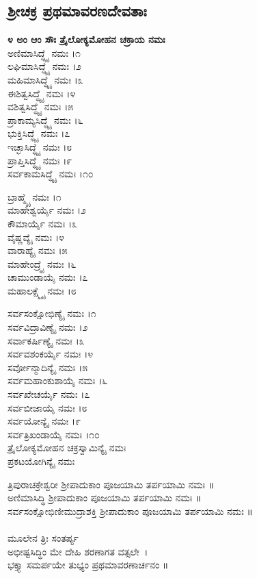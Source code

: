 \subsection{ಶ್ರೀಚಕ್ರ ಪ್ರಥಮಾವರಣದೇವತಾಃ}
{\bfseries ೪ ಅಂ ಆಂ ಸೌಃ ತ್ರೈಲೋಕ್ಯಮೋಹನ ಚಕ್ರಾಯ ನಮಃ }\\
 ಅಣಿಮಾಸಿದ್ಧ್ಯೈ ನಮಃ ।೧\\
 ಲಘಿಮಾಸಿದ್ಧ್ಯೈ ನಮಃ ।೨\\
 ಮಹಿಮಾಸಿದ್ಧ್ಯೈ ನಮಃ ।೩\\
 ಈಶಿತ್ವಸಿದ್ಧ್ಯೈ ನಮಃ ।೪\\
 ವಶಿತ್ವಸಿದ್ಧ್ಯೈ ನಮಃ ।೫\\
 ಪ್ರಾಕಾಮ್ಯಸಿದ್ಧ್ಯೈ ನಮಃ ।೬\\
 ಭುಕ್ತಿಸಿದ್ಧ್ಯೈ ನಮಃ ।೭\\
 ಇಚ್ಛಾಸಿದ್ಧ್ಯೈ ನಮಃ ।೮\\
 ಪ್ರಾಪ್ತಿಸಿದ್ಧ್ಯೈ ನಮಃ ।೯\\
 ಸರ್ವಕಾಮಸಿದ್ಧ್ಯೈ ನಮಃ ।೧೦

 ಬ್ರಾಹ್ಮ್ಯೈ ನಮಃ ।೧\\
 ಮಾಹೇಶ್ವರ್ಯೈ ನಮಃ ।೨\\
 ಕೌಮಾರ್ಯೈ ನಮಃ ।೩\\
 ವೈಷ್ಣವ್ಯೈ ನಮಃ ।೪\\
 ವಾರಾಹ್ಯೈ ನಮಃ ।೫\\
 ಮಾಹೇಂದ್ರ್ಯೈ ನಮಃ ।೬\\
 ಚಾಮುಂಡಾಯೈ ನಮಃ ।೭\\
 ಮಹಾಲಕ್ಷ್ಮ್ಯೈ ನಮಃ ।೮

 ಸರ್ವಸಂಕ್ಷೋಭಿಣ್ಯೈ ನಮಃ ।೧\\
 ಸರ್ವವಿದ್ರಾವಿಣ್ಯೈ ನಮಃ ।೨\\
 ಸರ್ವಾಕರ್ಷಿಣ್ಯೈ ನಮಃ ।೩\\
 ಸರ್ವವಶಂಕರ್ಯೈ ನಮಃ ।೪\\
 ಸರ್ವೋನ್ಮಾದಿನ್ಯೈ ನಮಃ ।೫\\
 ಸರ್ವಮಹಾಂಕುಶಾಯೈ ನಮಃ ।೬\\
 ಸರ್ವಖೇಚರ್ಯೈ ನಮಃ ।೭\\
 ಸರ್ವಬೀಜಾಯೈ ನಮಃ ।೮\\
 ಸರ್ವಯೋನ್ಯೈ ನಮಃ ।೯\\
 ಸರ್ವತ್ರಿಖಂಡಾಯೈ ನಮಃ ।೧೦\\
 ತ್ರೈಲೋಕ್ಯಮೋಹನ ಚಕ್ರಸ್ವಾಮಿನ್ಯೈ ನಮಃ\\
ಪ್ರಕಟಯೋಗಿನ್ಯೈ ನಮಃ

 ತ್ರಿಪುರಾಚಕ್ರೇಶ್ವರೀ ಶ್ರೀಪಾದುಕಾಂ ಪೂಜಯಾಮಿ ತರ್ಪಯಾಮಿ ನಮಃ ॥\\
 ಅಣಿಮಾಸಿದ್ಧಿ ಶ್ರೀಪಾದುಕಾಂ ಪೂಜಯಾಮಿ ತರ್ಪಯಾಮಿ ನಮಃ ॥\\
 ಸರ್ವಸಂಕ್ಷೋಭಿಣೀಮುದ್ರಾಶಕ್ತಿ ಶ್ರೀಪಾದುಕಾಂ ಪೂಜಯಾಮಿ ತರ್ಪಯಾಮಿ ನಮಃ ॥\\
\\
ಮೂಲೇನ ತ್ರಿಃ ಸಂತರ್ಪ್ಯ\\
 ಅಭೀಷ್ಟಸಿದ್ಧಿಂ ಮೇ ದೇಹಿ ಶರಣಾಗತ ವತ್ಸಲೇ~।\\
ಭಕ್ತ್ಯಾ ಸಮರ್ಪಯೇ ತುಭ್ಯಂ ಪ್ರಥಮಾವರಣಾರ್ಚನಂ ॥
